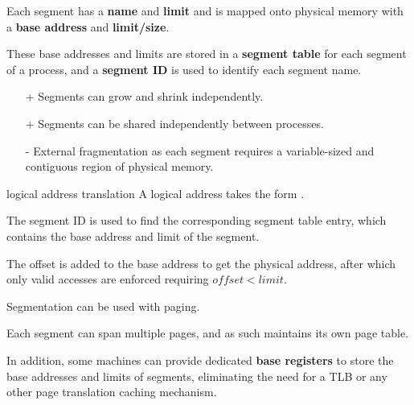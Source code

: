 Each segment has a \textbf{name} and \textbf{limit} and is mapped onto physical memory with a \textbf{base address} and \textbf{limit/size}.

These base addresses and limits are stored in a \textbf{segment table} for each segment
of a process, and a \textbf{segment ID} is used to identify each segment name.

\begin{itemize}
    \item[+] Segments can grow and shrink independently.
    \item[+] Segments can be shared independently between processes.
    \item[-] External fragmentation as each segment requires a variable-sized and contiguous region of physical memory.
\end{itemize}

\begin{defn}{logical address translation}
    A logical address takes the form .

    The segment ID is used to find the corresponding segment table entry, which contains the base address and limit of the segment.

    The offset is added to the base address to get the physical address, after which only valid accesses are enforced requiring $offset < limit$.
\end{defn}

Segmentation can be used with paging.

Each segment can span multiple pages, and as such maintains its own page table.

In addition, some machines can provide dedicated \textbf{base registers} to store the base addresses and limits of segments, eliminating the need for a TLB or any other page translation caching mechanism.